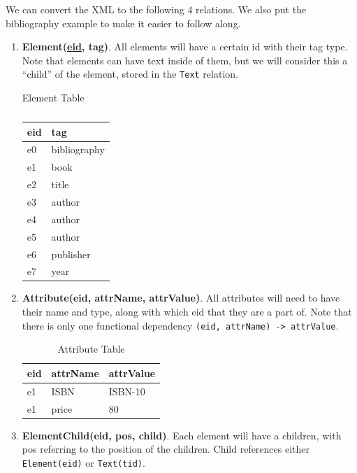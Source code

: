 \documentclass{article}
\begin{document}
    We can convert the XML to the following 4 relations. We also put the bibliography example to make it easier to follow along. 
    \begin{enumerate}
      \item \textbf{Element(\underline{eid}, tag)}. All elements will have a certain id with their tag type. Note that elements can have text inside of them, but we will consider this a ``child'' of the element, stored in the \texttt{Text} relation. 

        \begin{table}[H]
          \centering
          \caption{Element Table}
          \begin{tabular}{|l|l|}
            \hline
            \textbf{eid} & \textbf{tag} \\
            \hline
            e0 & bibliography \\
            e1 & book \\
            e2 & title \\
            e3 & author \\
            e4 & author \\
            e5 & author \\
            e6 & publisher \\
            e7 & year \\
            \hline
          \end{tabular}
          \caption{}
          \label{tab:}
        \end{table}

      \item \textbf{Attribute(eid, attrName, attrValue)}. All attributes will need to have their name and type, along with which eid that they are a part of. Note that there is only one functional dependency \texttt{(eid, attrName) -> attrValue}.

        \begin{table}[H]
          \centering
          \caption{Attribute Table}
          \begin{tabular}{|l|l|l|}
          \hline
          \textbf{eid} & \textbf{attrName} & \textbf{attrValue} \\
          \hline
          e1 & ISBN & ISBN-10 \\
          e1 & price & 80 \\
          \hline
          \end{tabular}
        \end{table}

      \item \textbf{ElementChild(eid, pos, child)}. Each element will have a children, with pos referring to the position of the children. Child references either \texttt{Element(eid)} or \texttt{Text(tid)}. 


\end{enumerate}
\end{document}
